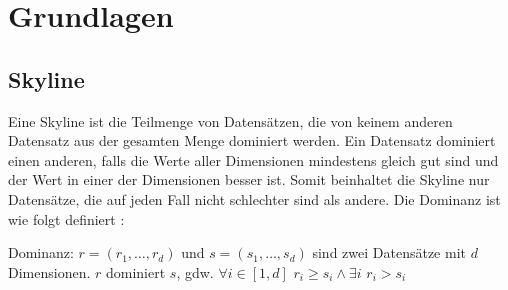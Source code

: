 \chapter{Grundlagen}
\label{ch:Grundlagen} 
\section{Skyline}
\label{ch:Grundlagen:sec:skyline}
Eine Skyline ist die Teilmenge von Datensätzen, die von keinem anderen Datensatz aus der gesamten Menge dominiert werden. Ein Datensatz dominiert einen anderen, falls die Werte aller Dimensionen mindestens gleich gut sind und der Wert in einer der Dimensionen besser ist. Somit beinhaltet die Skyline nur Datensätze, die auf jeden Fall nicht schlechter sind als andere. Die Dominanz ist wie folgt definiert \cite[p. 3]{magnani2014taking}:

\begin{Def}
Dominanz: $r=(r_1,\ldots,r_d)$ und $s=(s_1,\ldots,s_d)$ sind zwei Datensätze mit $d$ Dimensionen. $r$ dominiert $s$, gdw. $\forall{i} \in{[1,d]}$ $r_i \geq s_i \land \exists{i}$ $r_i > s_i$ 
\end{Def}

